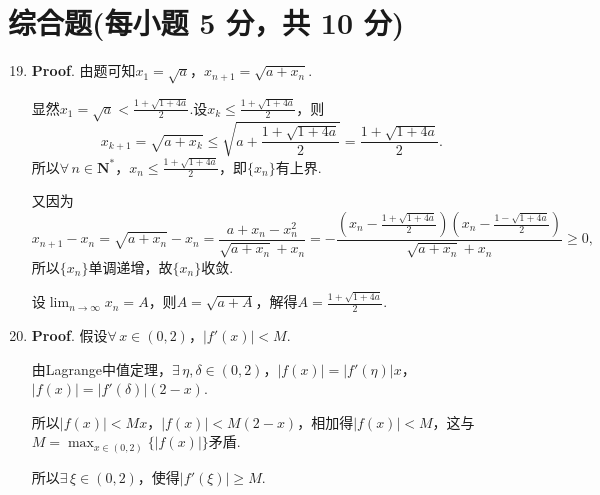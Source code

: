 \documentclass[../main.tex]{subfiles}
\begin{document}
\section{综合题(每小题 5 分，共 10 分)}
\begin{enumerate}
    \setcounter{enumi}{18}
    \item \textbf{Proof}. 由题可知$x_{1}=\sqrt{a}$，$x_{n+1}=\sqrt{a+x_{n}}$.

          显然$x_{1}=\sqrt{a}<\frac{1+\sqrt{1+4a}}{2}$.设$x_{k}\leq\frac{1+\sqrt{1+4a}}{2}$，则
          \[
              x_{k+1}=\sqrt{a+x_{k}}\leq\sqrt{a+\frac{1+\sqrt{1+4a}}{2}}=\frac{1+\sqrt{1+4a}}{2}
              .
          \]
          所以$\forall\,n\in\mathbf{N}^{*}$，$x_{n}\leq\frac{1+\sqrt{1+4a}}{2}$，即$\{
              x_{n}\}$有上界.

          又因为
          \[
              x_{n+1}-x_{n}=\sqrt{a+x_{n}}-x_{n}=\frac{a+x_{n}-x_{n}^{2}}{\sqrt{a+x_n}+x_{n}}
              =-\frac{(x_{n}-\frac{1+\sqrt{1+4a}}{2})(x_{n}-\frac{1-\sqrt{1+4a}}{2})}{\sqrt{a+x_n}+x_{n}}
              \geq0,
          \]
          所以$\{x_{n}\}$单调递增，故$\{x_{n}\}$收敛.

          设$\lim_{n\to\infty}x_{n}=A$，则$A=\sqrt{a+A}$，解得$A=\frac{1+\sqrt{1+4a}}{2}$.

    \item \textbf{Proof}. 假设$\forall\,x\in(0,2)$，$|f'(x)|<M$.

          由Lagrange中值定理，$\exists\,\eta,\delta\in\left(0,2\right)$，$|f(x)|=|f'(
              \eta)|x$，$|f(x)|=|f'(\delta)|(2-x)$.

          所以$|f(x)|<Mx$，$|f(x)|<M(2-x)$，相加得$|f(x)|<M$，这与$M=\max_{x\in(0,2)}
              \{|f(x)|\}$矛盾.

          所以$\exists\,\xi\in(0,2)$，使得$|f'(\xi)|\geq M$.
\end{enumerate}
\end{document}
